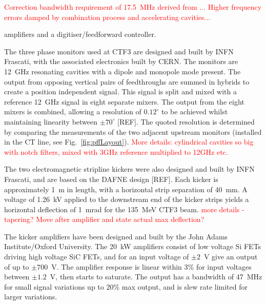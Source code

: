 \documentclass[%
 reprint,
superscriptaddress,
 amsmath,amssymb,
 prl,
]{revtex4-1}
\begin{document}
\textcolor{red}{Correction bandwidth requirement of 17.5~MHz derived from 
\cite{Gerber2015}... 
Higher frequency errors damped by combination process and accelerating 
cavities...}


amplifiers and a digitiser/feedforward controller.

The three phase monitors used at CTF3 \cite{phMonEuCard} are designed and built 
by INFN 
Frascati, with the 
associated electronics built by CERN. The monitors are 12~GHz resonating 
cavities with a dipole and monopole mode present. The output from opposing 
vertical pairs of feedthroughs are summed in hybrids to create a position 
independent signal. This signal is split and mixed with a reference 12~GHz 
signal in eight separate mixers. The output from the eight mixers is combined, 
allowing a resolution of \(0.12^\circ\) to be 
achieved whilst maintaining linearity between \(\pm70^\circ\) [REF]. The quoted 
resolution 
is determined by 
comparing the measurements of the two adjacent upstream monitors (installed in 
the CT 
line, see Fig.~\ref{fig:pffLayout}). \textcolor{red}{More details: cylindrical 
cavities so big with notch filters, mixed with 3GHz reference multiplied to 
12GHz etc.}

The two electromagnetic stripline kickers \cite{kickerIPAC11} were also 
designed and built by INFN 
Frascati,  
and are based on the DAFNE design [REF]. Each kicker is approximately 1~m in 
length, 
with a horizontal strip separation of 40~mm. A voltage of 1.26~kV applied to 
the 
downstream end of the kicker strips yields a horizontal deflection of 1~mrad 
for the 135~MeV CTF3 beam. \textcolor{red}{more details - tapering? Move after 
amplifier and state actual max deflection?}

The kicker amplifiers \cite{RobertsThesis} have been designed and built by the 
John Adams 
Institute/Oxford University. The 20~kW amplifiers consist of low voltage Si 
FETs 
driving high voltage SiC FETs, and for 
an input voltage of \(\pm2\)~V give an output of up to \(\pm700\)~V. The 
amplifier response is linear within 
3\% for input voltages between \(\pm1.2\)~V, then starts to saturate. The 
output 
has a bandwidth of 47~MHz for small signal variations up to 20\% max output, 
and is slew rate limited for larger variations.
\end{document}
